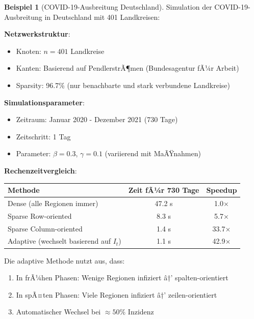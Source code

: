 ﻿\documentclass[a4paper,12pt]{report}
\theoremstyle{definition}
\newtheorem{beispiel}{Beispiel}
\begin{document}
	\begin{beispiel}[COVID-19-Ausbreitung Deutschland]
		Simulation der COVID-19-Ausbreitung in Deutschland mit 401 Landkreisen:
		
		\textbf{Netzwerkstruktur}:
		\begin{itemize}
			\item Knoten: $n = 401$ Landkreise
			\item Kanten: Basierend auf PendlerstrÃ¶men (Bundesagentur fÃ¼r Arbeit)
			\item Sparsity: 96.7\% (nur benachbarte und stark verbundene Landkreise)
		\end{itemize}
		
		\textbf{Simulationsparameter}:
		\begin{itemize}
			\item Zeitraum: Januar 2020 - Dezember 2021 (730 Tage)
			\item Zeitschritt: 1 Tag
			\item Parameter: $\beta = 0.3$, $\gamma = 0.1$ (variierend mit MaÃŸnahmen)
		\end{itemize}
		
		\textbf{Rechenzeitvergleich}:
		\begin{center}
			\begin{tabular}{|l|c|c|}
				\hline
				\textbf{Methode} & \textbf{Zeit fÃ¼r 730 Tage} & \textbf{Speedup} \\
				\hline
				Dense (alle Regionen immer) & 47.2 s & 1.0$\times$ \\
				Sparse Row-oriented & 8.3 s & 5.7$\times$ \\
				Sparse Column-oriented & 1.4 s & 33.7$\times$ \\
				Adaptive (wechselt basierend auf $I_t$) & 1.1 s & 42.9$\times$ \\
				\hline
			\end{tabular}
		\end{center}
		
		Die adaptive Methode nutzt aus, dass:
		\begin{enumerate}
			\item In frÃ¼hen Phasen: Wenige Regionen infiziert â†’ spalten-orientiert
			\item In spÃ¤ten Phasen: Viele Regionen infiziert â†’ zeilen-orientiert
			\item Automatischer Wechsel bei $\approx 50\%$ Inzidenz
		\end{enumerate}
	\end{beispiel}
	
\end{document}
